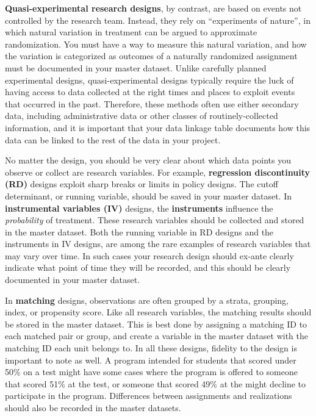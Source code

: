 \textbf{Quasi-experimental research designs},
by contrast, are based on events not controlled by the research team.
Instead, they rely on ``experiments of nature'',
in which natural variation in treatment can be argued to approximate randomization.
You must have a way to measure this natural variation,
and how the variation is categorized as outcomes of a naturally randomized assignment
must be documented in your master dataset.
Unlike carefully planned experimental designs,
quasi-experimental designs typically require the luck
of having access to data collected at the right times and places
to exploit events that occurred in the past.
Therefore, these methods often use either secondary data,
including administrative data or other classes of routinely-collected information,
and it is important that your data linkage table documents
how this data can be linked to the rest of the data in your project.



No matter the design, you should be very clear about
which data points you observe or collect are research variables.
For example,
\textbf{regression discontinuity (RD)}
designs exploit sharp breaks or limits
in policy designs.
The cutoff determinant, or running variable,
should be saved in your master dataset.
In \textbf{instrumental variables (IV)}
designs, the \textbf{instruments} influence the \textit{probability} of treatment.
These research variables should be collected
and stored in the master dataset.
Both the running variable in RD designs
and the instruments in IV designs,
are among the rare examples of research variables
that may vary over time.
In such cases your research design should
ex-ante clearly indicate what point of time they will be recorded,
and this should be clearly documented in your master dataset.

In \textbf{matching} designs, observations are often grouped
by a strata, grouping, index, or propensity score.
Like all research variables, the matching results
should be stored in the master dataset.
This is best done by assigning a matching ID
to each matched pair or group,
and create a variable in the master dataset
with the matching ID each unit belongs to.
In all these designs, fidelity to the design is important to note as well.
A program intended for students that scored under 50\% on a test
might have some cases where the program is offered to someone that scored 51\% at the test,
or someone that scored 49\% at the might decline to participate in the program.
Differences between assignments and realizations
should also be recorded in the master datasets.

